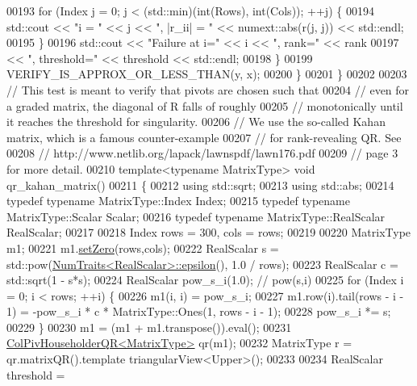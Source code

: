 \begin{DoxyCode}
00193       \textcolor{keywordflow}{for} (Index j = 0; j < (std::min)(\textcolor{keywordtype}{int}(Rows), \textcolor{keywordtype}{int}(Cols)); ++j) \{
00194         std::cout << \textcolor{stringliteral}{"i = "} << j << \textcolor{stringliteral}{", |r\_ii| = "} << numext::abs(r(j, j)) << std::endl;
00195       \}
00196       std::cout << \textcolor{stringliteral}{"Failure at i="} << i << \textcolor{stringliteral}{", rank="} << rank
00197                 << \textcolor{stringliteral}{", threshold="} << threshold << std::endl;
00198     \}
00199     VERIFY\_IS\_APPROX\_OR\_LESS\_THAN(y, x);
00200   \}
00201 \}
00202 
00203 \textcolor{comment}{// This test is meant to verify that pivots are chosen such that}
00204 \textcolor{comment}{// even for a graded matrix, the diagonal of R falls of roughly}
00205 \textcolor{comment}{// monotonically until it reaches the threshold for singularity.}
00206 \textcolor{comment}{// We use the so-called Kahan matrix, which is a famous counter-example}
00207 \textcolor{comment}{// for rank-revealing QR. See}
00208 \textcolor{comment}{// http://www.netlib.org/lapack/lawnspdf/lawn176.pdf}
00209 \textcolor{comment}{// page 3 for more detail.}
00210 \textcolor{keyword}{template}<\textcolor{keyword}{typename} MatrixType> \textcolor{keywordtype}{void} qr\_kahan\_matrix()
00211 \{
00212   \textcolor{keyword}{using} std::sqrt;
00213   \textcolor{keyword}{using} std::abs;
00214   \textcolor{keyword}{typedef} \textcolor{keyword}{typename} MatrixType::Index Index;
00215   \textcolor{keyword}{typedef} \textcolor{keyword}{typename} MatrixType::Scalar Scalar;
00216   \textcolor{keyword}{typedef} \textcolor{keyword}{typename} MatrixType::RealScalar RealScalar;
00217 
00218   Index rows = 300, cols = rows;
00219 
00220   MatrixType m1;
00221   m1.\hyperlink{class_eigen_1_1_plain_object_base_ac21ad5f989f320e46958b75ac8d9a1da}{setZero}(rows,cols);
00222   RealScalar s = std::pow(\hyperlink{group___core___module_struct_eigen_1_1_num_traits}{NumTraits<RealScalar>::epsilon}(), 1.0 / rows);
00223   RealScalar c = std::sqrt(1 - s*s);
00224   RealScalar pow\_s\_i(1.0); \textcolor{comment}{// pow(s,i)}
00225   \textcolor{keywordflow}{for} (Index i = 0; i < rows; ++i) \{
00226     m1(i, i) = pow\_s\_i;
00227     m1.row(i).tail(rows - i - 1) = -pow\_s\_i * c * MatrixType::Ones(1, rows - i - 1);
00228     pow\_s\_i *= s;
00229   \}
00230   m1 = (m1 + m1.transpose()).eval();
00231   \hyperlink{group___q_r___module}{ColPivHouseholderQR<MatrixType>} qr(m1);
00232   MatrixType r = qr.matrixQR().template triangularView<Upper>();
00233 
00234   RealScalar threshold =

\end{DoxyCode}

